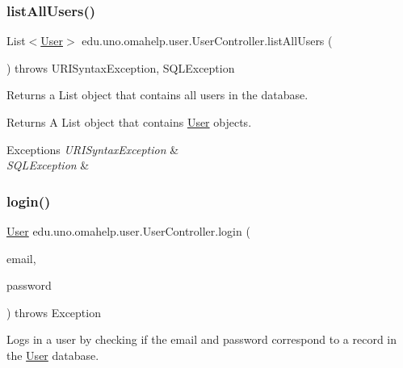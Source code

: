 \subsubsection{\texorpdfstring{list\+All\+Users()}{listAllUsers()}}
{\footnotesize\ttfamily List$<$\mbox{\hyperlink{classedu_1_1uno_1_1omahelp_1_1user_1_1_user}{User}}$>$ edu.\+uno.\+omahelp.\+user.\+User\+Controller.\+list\+All\+Users (\begin{DoxyParamCaption}{ }\end{DoxyParamCaption}) throws U\+R\+I\+Syntax\+Exception, S\+Q\+L\+Exception}

Returns a List object that contains all users in the database.

\begin{DoxyReturn}{Returns}
A List object that contains \mbox{\hyperlink{classedu_1_1uno_1_1omahelp_1_1user_1_1_user}{User}} objects. 
\end{DoxyReturn}

\begin{DoxyExceptions}{Exceptions}
{\em U\+R\+I\+Syntax\+Exception} & \\
\hline
{\em S\+Q\+L\+Exception} & \\
\hline
\end{DoxyExceptions}
\mbox{\label{classedu_1_1uno_1_1omahelp_1_1user_1_1_user_controller_ac9c9bf78bbd14781ac3493e6d1cfcffc}} 
\subsubsection{\texorpdfstring{login()}{login()}}
{\footnotesize\ttfamily \mbox{\hyperlink{classedu_1_1uno_1_1omahelp_1_1user_1_1_user}{User}} edu.\+uno.\+omahelp.\+user.\+User\+Controller.\+login (\begin{DoxyParamCaption}\item[{@Request\+Param String}]{email,  }\item[{@Request\+Param String}]{password }\end{DoxyParamCaption}) throws Exception}

Logs in a user by checking if the email and password correspond to a record in the \mbox{\hyperlink{classedu_1_1uno_1_1omahelp_1_1user_1_1_user}{User}} database.


